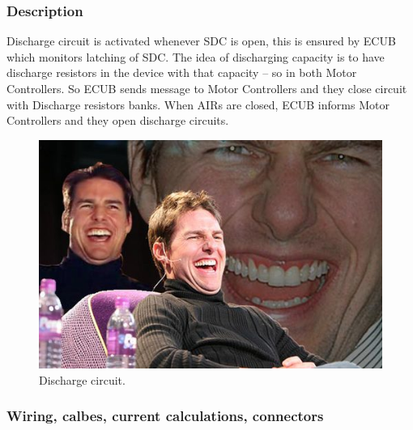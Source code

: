 \subsubsection{Description}

Discharge circuit is activated whenever SDC is open, this is ensured by ECUB which monitors latching of SDC. The idea of discharging capacity is to have discharge resistors in the device with that capacity – so in both Motor Controllers. So ECUB sends message to Motor Controllers and they close circuit with Discharge resistors banks. When AIRs are closed, ECUB informs Motor Controllers and they open discharge circuits.

\begin{figure}[H]
	\centering
	\includegraphics[width=\textwidth]{./img/tsal-wiring.jpg}
	\caption{Discharge circuit.}
	\label{fig:discharge-circuit}
\end{figure}

\subsubsection{Wiring, calbes, current calculations, connectors}

